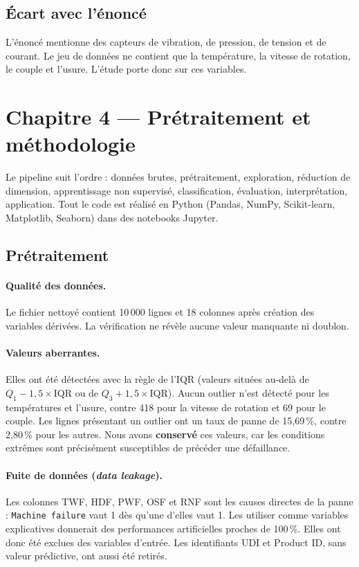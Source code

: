 \documentclass[12pt,a4paper]{article}
\begin{document}
\subsection{Écart avec l'énoncé}
L'énoncé mentionne des capteurs de vibration, de pression, de tension et de courant. Le jeu de données ne contient que la température, la vitesse de rotation, le couple et l'usure. L'étude porte donc sur ces variables.

\section{Chapitre 4 — Prétraitement et méthodologie}\label{sec:methodo}

Le pipeline suit l'ordre : données brutes, prétraitement, exploration, réduction de dimension, apprentissage non supervisé, classification, évaluation, interprétation, application. Tout le code est réalisé en Python (Pandas, NumPy, Scikit-learn, Matplotlib, Seaborn) dans des notebooks Jupyter.

\subsection{Prétraitement}

\paragraph{Qualité des données.} Le fichier nettoyé contient 10\,000 lignes et 18 colonnes après création des variables dérivées. La vérification ne révèle aucune valeur manquante ni doublon.

\paragraph{Valeurs aberrantes.} Elles ont été détectées avec la règle de l'IQR (valeurs situées au-delà de $Q_1 - 1{,}5\times \mathrm{IQR}$ ou de $Q_3 + 1{,}5\times \mathrm{IQR}$). Aucun outlier n'est détecté pour les températures et l'usure, contre 418 pour la vitesse de rotation et 69 pour le couple. Les lignes présentant un outlier ont un taux de panne de 15,69\,\%, contre 2,80\,\% pour les autres. Nous avons \textbf{conservé} ces valeurs, car les conditions extrêmes sont précisément susceptibles de précéder une défaillance.

\paragraph{Fuite de données (\emph{data leakage}).} Les colonnes TWF, HDF, PWF, OSF et RNF sont les causes directes de la panne : \texttt{Machine failure} vaut 1 dès qu'une d'elles vaut 1. Les utiliser comme variables explicatives donnerait des performances artificielles proches de 100\,\%. Elles ont donc été exclues des variables d'entrée. Les identifiants UDI et Product ID, sans valeur prédictive, ont aussi été retirés.
\end{document}
